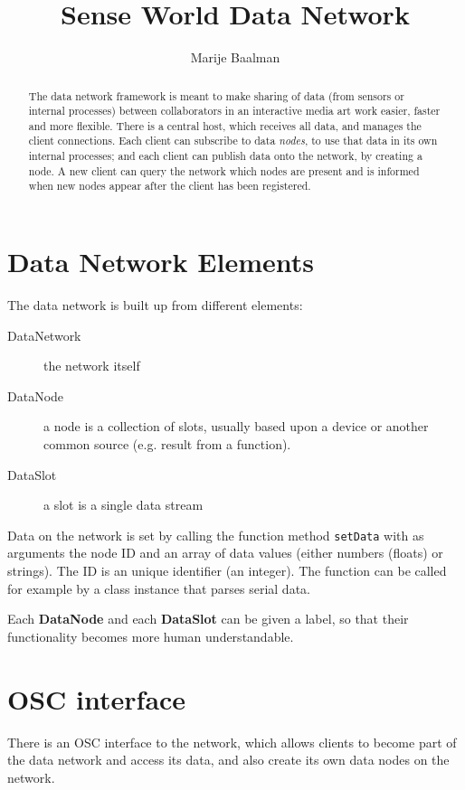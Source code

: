 \documentclass[letterpaper,10pt]{article}
\title{Sense World Data Network}
\author{Marije Baalman}
\begin{document}

\maketitle

\begin{abstract}
The data network framework is meant to make sharing of data (from sensors or internal processes) between collaborators in an interactive media art work easier, faster and more flexible. There is a central host, which receives all data, and manages the client connections. Each client can subscribe to data \textit{nodes}, to use that data in its own internal processes; and each client can publish data onto the network, by creating a node. A new client can query the network which nodes are present and is informed when new nodes appear after the client has been registered.
\end{abstract}

\section{Data Network Elements}

The data network is built up from different elements:
\begin{description}
 \item [DataNetwork] the network itself
 \item [DataNode] a node is a collection of slots, usually based upon a device or another common source (e.g. result from a function).
 \item [DataSlot] a slot is a single data stream
\end{description}

Data on the network is set by calling the function method \verb|setData| with as arguments the node ID and an array of data values (either numbers (floats) or strings). The ID is an unique identifier (an integer). The function can be called for example by a class instance that parses serial data.

Each \textbf{DataNode} and each \textbf{DataSlot} can be given a label, so that their functionality becomes more human understandable.

\section{OSC interface}
There is an OSC interface to the network, which allows clients to become part of the data network and access its data, and also create its own data nodes on the network.
\end{document}
